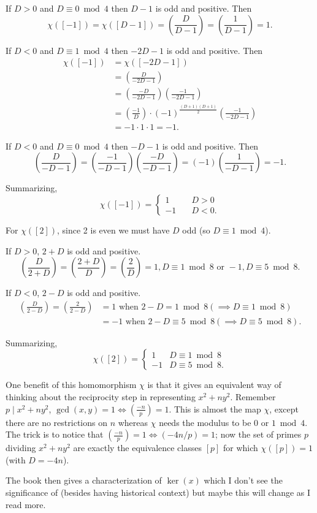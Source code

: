 \documentclass[b5paper,12pt,oneside,openright]{memoir}
\newcommand{\jacobi}[2]{\left(\frac{#1}{#2}\right)}
\begin{document}
If $D>0$ and $D\equiv 0\bmod 4$ then $D-1$ is odd and positive. Then
\[\chi([-1]) = \chi([D-1]) = \jacobi{D}{D-1} = \jacobi{1}{D-1} = 1.\]

If $D<0$ and $D\equiv 1\bmod 4$ then $-2D-1$ is odd and positive. Then
\begin{align*}
  \chi([-1]) &= \chi([-2D-1])\\
             &= \jacobi{D}{-2D-1}\\
             &= \jacobi{-D}{-2D-1}\jacobi{-1}{-2D-1}\\
             &= \jacobi{-1}{D}\cdot(-1)^\frac{(D+1)(D+1)}{2}\jacobi{-1}{-2D-1}\\
             &= -1\cdot 1\cdot 1 = -1.
\end{align*}

If $D<0$ and $D\equiv 0\bmod 4$ then $-D-1$ is odd and positive. Then
\[\jacobi{D}{-D-1} = \jacobi{-1}{-D-1}\jacobi{-D}{-D-1} = (-1)\jacobi{1}{-D-1} = -1.\]

Summarizing,
\[\chi([-1]) =
  \begin{cases}
    1&\quad D>0\\
    -1&\quad D<0.
  \end{cases}
\]

For $\chi([2])$, since 2 is even we must have $D$ odd (so $D\equiv 1\bmod 4$).

If $D>0$, $2+D$ is odd and positive.
\[\jacobi{D}{2+D} = \jacobi{2+D}{D} = \jacobi{2}{D} = 1, D\equiv 1\bmod 8\text{ or }-1, D\equiv 5\bmod 8.\]

If $D<0$, $2{-}D$ is odd and positive.
\begin{align*}
\jacobi{D}{2{-}D} = \jacobi{2}{2{-}D} &= 1\text{ when }2{-}D=1\bmod 8 (\implies D\equiv 1\bmod 8)\\
&=-1\text{ when }2{-}D\equiv 5\bmod 8 (\implies D\equiv 5\bmod 8).
\end{align*}

Summarizing,
\[\chi([2]) =
  \begin{cases}
    1& D\equiv 1\bmod 8\\
    -1& D\equiv 5\bmod 8.
  \end{cases}
\]

One benefit of this homomorphism $\chi$ is that it gives an equivalent way of thinking about the reciprocity step in representing $x^2 + ny^2$.
Remember $p\mid x^2+ny^2$, $\gcd(x,y)=1 \iff (\frac{-n}{p})=1$.
This is almost the map $\chi$, except there are no restrictions on $n$ whereas $\chi$ needs the modulus to be 0 or $1\bmod 4$.
The trick is to notice that $(\frac{-n}{p})=1 \iff (-4n/p)=1$; now the set of primes $p$ dividing $x^2+ny^2$ are exactly the equivalence classes $[p]$ for which $\chi([p])=1$ (with $D=-4n$).

The book then gives a characterization of $\ker(x)$ which I don't see the significance of (besides having historical context) but maybe this will change as I read more.
\end{document}
